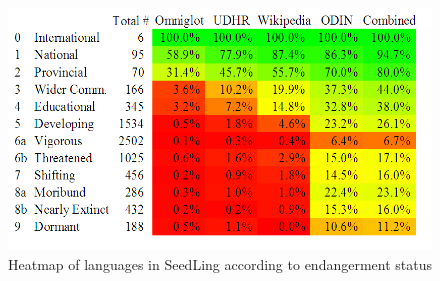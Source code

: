 
\begin{figure}[t]
\begin{centering}
\includegraphics[scale=0.63]{heatmap-numbers.png}
\caption{Heatmap of languages in SeedLing according to endangerment status}\label{fig:heatmap}
\end{centering}
\end{figure}
